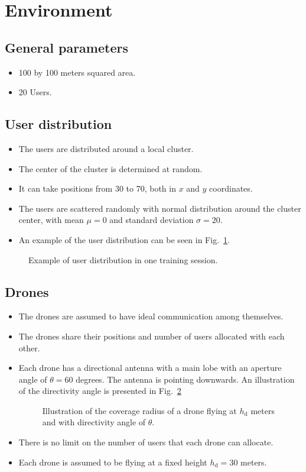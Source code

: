 \documentclass{IEEEtran}
\begin{document}
\section{Environment}
\subsection{General parameters}
\begin{itemize}
    \item 100 by 100 meters squared area.
    \item 20 Users.
\end{itemize}
\subsection{User distribution}
\begin{itemize}
    \item The users are distributed around a local cluster.
    \item The center of the cluster is determined at random.
    \item It can take positions from 30 to 70, both in $x$ and $y$ coordinates.
    \item The users are scattered randomly with normal distribution around the cluster center, with mean $\mu = 0$ and standard deviation $\sigma = 20$.
    \item An example of the user distribution can be seen in Fig.~\ref{fig:users}.
\end{itemize}
\begin{figure}[h!]
    \resizebox{\columnwidth}{!}{}
    \caption{Example of user distribution in one training session.}\label{fig:users}
\end{figure}
\subsection{Drones}
\begin{itemize}
    \item The drones are assumed to have ideal communication among themselves.
    \item The drones share their positions and number of users allocated with each other.
    \item Each drone has a directional antenna with a main lobe with an aperture angle of $\theta=60$ degrees. The antenna is pointing downwards. An illustration of the directivity angle is presented in Fig.~\ref{fig:angle}
        \begin{figure}
            \centering
            \resizebox{.5\columnwidth}{!}{}
            \caption{Illustration of the coverage radius of a drone flying at $h_\text{d}$ meters and with directivity angle of $\theta$.}\label{fig:angle}
        \end{figure}
    \item There is no limit on the number of users that each drone can allocate.
    \item Each drone is assumed to be flying at a fixed height ${h_\text{d} = 30}$ meters.
\end{itemize}
\end{document}
